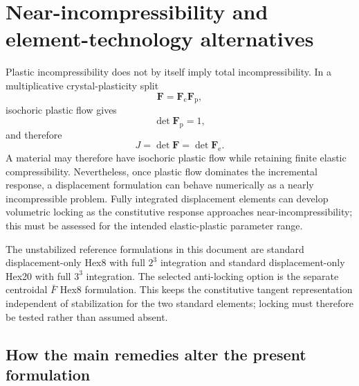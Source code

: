 \documentclass[11pt,a4paper]{article}
\newcommand{\bs}[1]{\boldsymbol{#1}}
\newcommand{\F}{\bs{F}}
\newcommand{\Fe}{\bs{F}_{\mathrm e}}
\newcommand{\Fp}{\bs{F}_{\mathrm p}}
\begin{document}
\section{Near-incompressibility and element-technology alternatives}
\label{app:locking}

Plastic incompressibility does not by itself imply total incompressibility. In a multiplicative crystal-plasticity split
\begin{equation}
\F=\Fe\Fp,
\end{equation}
isochoric plastic flow gives
\begin{equation}
\det\Fp=1,
\end{equation}
and therefore
\begin{equation}
J=\det\F=\det\Fe.
\end{equation}
A material may therefore have isochoric plastic flow while retaining finite elastic compressibility. Nevertheless, once plastic flow dominates the incremental response, a displacement formulation can behave numerically as a nearly incompressible problem. Fully integrated displacement elements can develop volumetric locking as the constitutive response approaches near-incompressibility; this must be assessed for the intended elastic-plastic parameter range.

The unstabilized reference formulations in this document are standard displacement-only Hex8 with full $2^3$ integration and standard displacement-only Hex20 with full $3^3$ integration. The selected anti-locking option is the separate centroidal $\bar F$ Hex8 formulation. This keeps the constitutive tangent representation independent of stabilization for the two standard elements; locking must therefore be tested rather than assumed absent.

\subsection{How the main remedies alter the present formulation}
\end{document}
